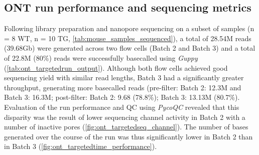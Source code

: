 \newpage
\subsection{ONT run performance and sequencing metrics}
\label{ch6: ont_run_performance}
Following library preparation and nanopore sequencing on a subset of samples (n = 8 WT, n = 10 TG, \cref{tab:mouse_samples_sequenced}), a total of 28.54M reads (39.68Gb) were generated across two flow cells (Batch 2 and Batch 3) and a total of 22.8M (80\%) reads were successfully basecalled using \textit{Guppy} (\cref{tab:ont_targetedrun_output}). Although both flow cells achieved good sequencing yield with similar read lengths, Batch 3 had a significantly greater throughput, generating more basecalled reads (pre-filter: Batch 2: 12.3M and Batch 3: 16.3M; post-filter: Batch 2: 9.68 (78.8\%); Batch 3: 13.13M (80.7\%). Evaluation of the run performance and QC using \textit{PycoQC} revealed that this disparity was the result of lower sequencing channel activity in Batch 2 with a number of inactive pores (\cref{fig:ont_targetedseq_channel}). The number of bases generated over the course of the run was thus significantly lower in Batch 2 than in Batch 3 (\cref{fig:ont_targetedtime_performance}).  


